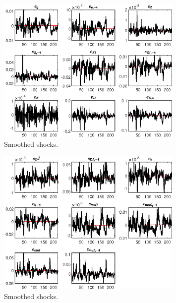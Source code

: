  
\begin{figure}[H]
\centering 
\includegraphics[width=0.80\textwidth]{BRS_sectoral/graphs/BRS_sectoral_SmoothedShocks1}
\caption{Smoothed shocks.}\label{Fig:SmoothedShocks:1}
\end{figure}

\begin{figure}[H]
\centering 
\includegraphics[width=0.80\textwidth]{BRS_sectoral/graphs/BRS_sectoral_SmoothedShocks2}
\caption{Smoothed shocks.}\label{Fig:SmoothedShocks:2}
\end{figure}


